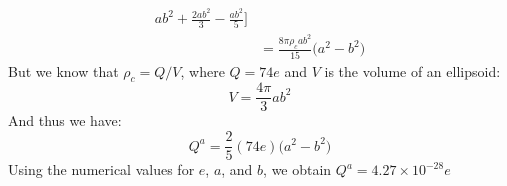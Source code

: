 \documentclass[crop=false,class=book,oneside]{standalone}
\begin{document}
\begin{solution}
\begin{subequations}
\begin{align}
                                     ab^{2}+
                                     \frac{2ab^{2}}{3}-
                                     \frac{ab^{2}}{5}\Big]\\
                            &=\frac{8\pi\rho_{c}ab^{2}}{15}
                                \big(a^{2}-b^{2}\big)
                    \end{align}
                \end{subequations}
                But we know that $\rho_{c}=Q/V$, where $Q=74e$ and
                $V$ is the volume of an ellipsoid:
                \begin{equation}
                    V=\frac{4\pi}{3}ab^{2}
                \end{equation}
                And thus we have:
                \begin{equation}
                    Q^{a}=\frac{2}{5}(74e)\big(a^{2}-b^{2}\big)
                \end{equation}
                Using the numerical values for $e$, $a$, and $b$, we
                obtain $Q^{a}=4.27\times{10}^{-28}e$
            \end{solution}
\end{document}
